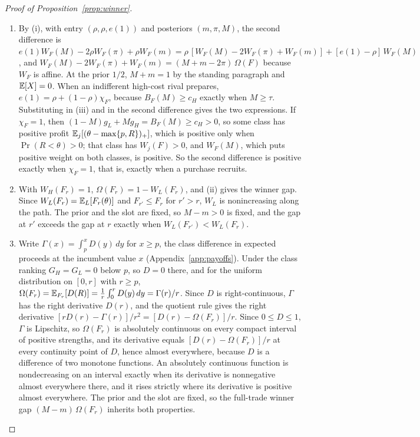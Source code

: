 \begin{proof}[Proof of Proposition~\ref{prop:winner}]
\begin{enumerate}[label=(\roman*),leftmargin=2em]
\(e(1)=\rho\) in both lines; positivity follows from (i).
\item By (i), with entry \((\rho,\rho,e(1))\) and posteriors \((m,\pi,M)\), the second difference is
\(e(1)W_F(M)-2\rho W_F(\pi)+\rho W_F(m)=\rho\,[W_F(M)-2W_F(\pi)+W_F(m)]+[e(1)-\rho]\,W_F(M)\), and
\(W_F(M)-2W_F(\pi)+W_F(m)=(M+m-2\pi)\,\Omega(F)\) because \(W_F\) is affine. At the prior \(1/2\), \(M+m=1\) by the
standing paragraph and \(\mathbb{E}[X]=0\). When an indifferent high-cost rival prepares, \(e(1)=\rho+(1-\rho)\chi_F\),
because \(B_F(M)\ge c_H\) exactly when \(M\ge\tau\). Substituting in (iii) and in the second difference gives the two
expressions. If \(\chi_F=1\), then \((1-M)g_L+Mg_H=B_F(M)\ge c_H>0\), so some class has positive profit
\(\mathbb{E}_j[(\theta-\max\{p,R\})_+]\), which is positive only when \(\Pr(R<\theta)>0\); that class has \(W_j(F)>0\), and
\(W_F(M)\), which puts positive weight on both classes, is positive. So the second difference is positive exactly when
\(\chi_F=1\), that is, exactly when a purchase recruits.
\item With \(W_H(F_r)=1\), \(\Omega(F_r)=1-W_L(F_r)\), and (ii) gives the winner gap. Since
\(W_L(F_r)=\mathbb{E}_L[F_r(\theta)]\) and \(F_{r'}\le F_r\) for \(r'>r\), \(W_L\) is nonincreasing along the path. The prior and
the slot are fixed, so \(M-m>0\) is fixed, and the gap at \(r'\) exceeds the gap at \(r\) exactly when
\(W_L(F_{r'})<W_L(F_r)\).
\item Write \(\Gamma(x)=\int_p^xD(y)\,dy\) for \(x\ge p\), the class difference in expected proceeds at the incumbent
value \(x\) (Appendix~\ref{app:payoffs}). Under the class ranking \(G_H=G_L=0\) below \(p\), so \(D=0\) there, and for
the uniform distribution on \([0,r]\) with \(r\ge p\), \(\Omega(F_r)=\mathbb{E}_{F_r}[D(R)]=\frac1r\int_0^rD(y)\,dy=\Gamma(r)/r\). Since
\(D\) is right-continuous, \(\Gamma\) has the right derivative \(D(r)\), and the quotient rule gives the right
derivative \([rD(r)-\Gamma(r)]/r^2=[D(r)-\Omega(F_r)]/r\). Since \(0\le D\le1\), \(\Gamma\) is Lipschitz, so
\(\Omega(F_r)\) is absolutely continuous on every compact interval of positive strengths, and its derivative equals
\([D(r)-\Omega(F_r)]/r\) at every continuity point of \(D\), hence almost everywhere, because \(D\) is a difference of
two monotone functions. An absolutely continuous function is nondecreasing on an interval exactly when its derivative is
nonnegative almost everywhere there, and it rises strictly where its derivative is positive almost everywhere. The
prior and the slot are fixed, so the full-trade winner gap \((M-m)\,\Omega(F_r)\) inherits both properties.\qedhere
\end{enumerate}
\end{proof}

